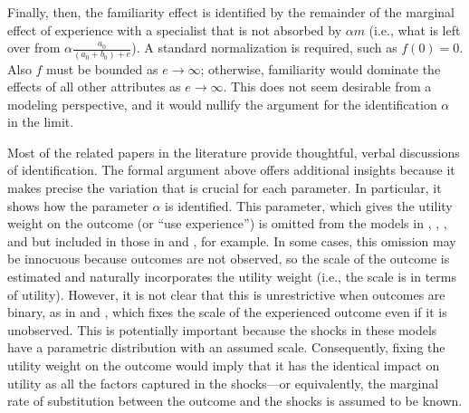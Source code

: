 \documentclass[12pt]{article}
\begin{document}
Finally, then, the familiarity effect is identified by the remainder of the marginal effect of experience with a specialist that is not absorbed by $\alpha m$ (i.e., what is left over from $\alpha \frac{ a_0 }{ (a_0 + b_0) + e}$).
A standard normalization is required, such as $f(0) = 0$. Also $f$ must be bounded as $e \rightarrow \infty$; otherwise, familiarity would dominate the effects of all other attributes as $e \rightarrow \infty$. This does not seem desirable from a modeling perspective, and it would nullify the argument for the identification $\alpha$ in the limit.

Most of the related papers in the literature provide thoughtful, verbal discussions of identification.  The formal argument above offers additional insights because it makes precise the variation that is crucial for each parameter. In particular, it shows how the parameter $\alpha$ is identified.
This parameter, which gives the utility weight on the outcome (or ``use experience'') is omitted from the models in \cite{crawford2005}, \cite{ferreyra2011}, \cite{dickstein2018}, and \cite{gong2018} but included in those in \cite{ching2010} and \cite{ching2013}, for example. In some cases, this omission may be innocuous because outcomes are not observed, so the scale of the outcome is estimated and naturally incorporates the utility weight (i.e., the scale is in terms of utility).  However, it is not clear that this is unrestrictive when outcomes are binary, as in \cite{dickstein2018} and \cite{gong2018}, which fixes the scale of the experienced outcome even if it is unobserved. This is potentially important because the shocks in these models have a parametric distribution with an assumed scale. Consequently, fixing the utility weight on the outcome would imply that it has the identical impact on utility as all the factors captured in the shocks---or equivalently, the marginal rate of substitution between the outcome and the shocks is assumed to be known.
\end{document}
